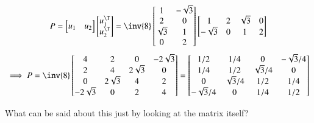 \[
P =
\begin{bmatrix}
u_1 & u_2 \\
\end{bmatrix}
\begin{bmatrix}
u_1^\T \\
u_2^\T \\
\end{bmatrix}
=
\inv{8}
\begin{bmatrix}
1 & -\sqrt{3} \\
2 & 0 \\
\sqrt{3} & 1 \\
0 & 2 \\
\end{bmatrix}
\begin{bmatrix}
1 & 2 & \sqrt{3} & 0 \\
-\sqrt{3} & 0 & 1 & 2 \\
\end{bmatrix}
\]
\[
\implies
P =
\inv{8}
\begin{bmatrix}
4 & 2 & 0 & -2\sqrt{3} \\
2 & 4 & 2\sqrt{3} & 0 \\
0 & 2\sqrt{3} & 4 & 2 \\
-2\sqrt{3} & 0 & 2 & 4 \\
\end{bmatrix}
=
\begin{bmatrix}
1/2 & 1/4 & 0 & -\sqrt{3}/4 \\
1/4 & 1/2 & \sqrt{3}/4 & 0 \\
0 & \sqrt{3}/4 & 1/2 & 1/4 \\
-\sqrt{3}/4 & 0 & 1/4 & 1/2 \\
\end{bmatrix}
\]

What can be said about this just by looking at the matrix itself?

